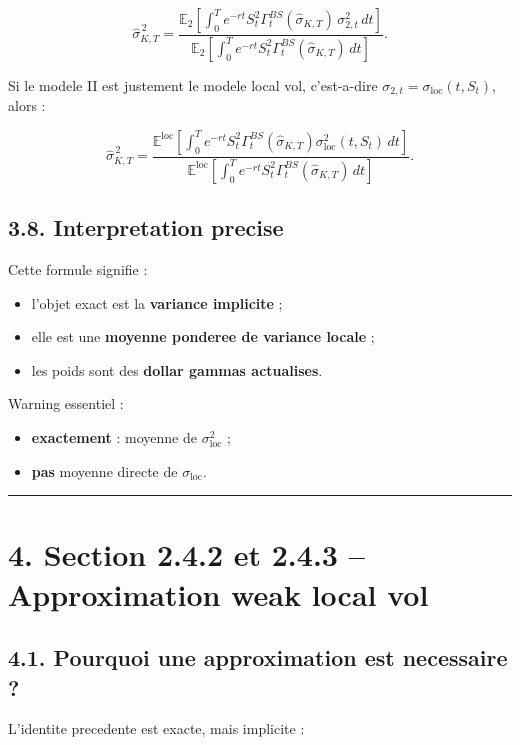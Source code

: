 \documentclass[11pt,a4paper]{article}
\begin{document}
\[
\widehat{\sigma}_{K,T}^{\,2}
=
\frac{
\mathbb E_2\left[
\int_0^T e^{-rt}S_t^2\Gamma_t^{BS}(\widehat{\sigma}_{K,T})\,\sigma_{2,t}^2\,dt
\right]
}{
\mathbb E_2\left[
\int_0^T e^{-rt}S_t^2\Gamma_t^{BS}(\widehat{\sigma}_{K,T})\,dt
\right]
}.
\]

Si le modele II est justement le modele local vol, c'est-a-dire \(\sigma_{2,t}=\sigma_{\mathrm{loc}}(t,S_t)\), alors :

\[
\boxed{
\widehat{\sigma}_{K,T}^{\,2}
=
\frac{
\mathbb E^{\mathrm{loc}}\!\left[
\int_0^T e^{-rt}S_t^2\Gamma_t^{BS}(\widehat{\sigma}_{K,T})
\sigma_{\mathrm{loc}}^2(t,S_t)\,dt
\right]
}{
\mathbb E^{\mathrm{loc}}\!\left[
\int_0^T e^{-rt}S_t^2\Gamma_t^{BS}(\widehat{\sigma}_{K,T})\,dt
\right]
}.
}
\]

\subsection{3.8. Interpretation precise}

Cette formule signifie :

\begin{itemize}
\item l'objet exact est la \textbf{variance implicite} ;
\item elle est une \textbf{moyenne ponderee de variance locale} ;
\item les poids sont des \textbf{dollar gammas actualises}.
\end{itemize}

Warning essentiel :

\begin{itemize}
\item \textbf{exactement} : moyenne de \(\sigma_{\mathrm{loc}}^2\) ;
\item \textbf{pas} moyenne directe de \(\sigma_{\mathrm{loc}}\).
\end{itemize}

\bigskip\hrule\bigskip

\section{4. Section 2.4.2 et 2.4.3 -- Approximation weak local vol}

\subsection{4.1. Pourquoi une approximation est necessaire ?}

L'identite precedente est exacte, mais implicite :
\end{document}
